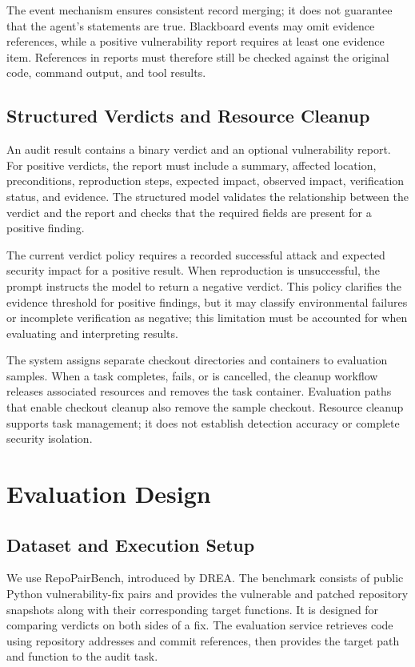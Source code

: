 \documentclass[10pt,a4paper]{article}
\begin{document}
The event mechanism ensures consistent record merging; it does not guarantee that the agent's statements are true. Blackboard events may omit evidence references, while a positive vulnerability report requires at least one evidence item. References in reports must therefore still be checked against the original code, command output, and tool results.

\subsection{Structured Verdicts and Resource Cleanup}

An audit result contains a binary verdict and an optional vulnerability report. For positive verdicts, the report must include a summary, affected location, preconditions, reproduction steps, expected impact, observed impact, verification status, and evidence. The structured model validates the relationship between the verdict and the report and checks that the required fields are present for a positive finding.

The current verdict policy requires a recorded successful attack and expected security impact for a positive result. When reproduction is unsuccessful, the prompt instructs the model to return a negative verdict. This policy clarifies the evidence threshold for positive findings, but it may classify environmental failures or incomplete verification as negative; this limitation must be accounted for when evaluating and interpreting results.

The system assigns separate checkout directories and containers to evaluation samples. When a task completes, fails, or is cancelled, the cleanup workflow releases associated resources and removes the task container. Evaluation paths that enable checkout cleanup also remove the sample checkout. Resource cleanup supports task management; it does not establish detection accuracy or complete security isolation.

\section{Evaluation Design}

\subsection{Dataset and Execution Setup}

We use RepoPairBench, introduced by DREA. The benchmark consists of public Python vulnerability-fix pairs and provides the vulnerable and patched repository snapshots along with their corresponding target functions. It is designed for comparing verdicts on both sides of a fix. The evaluation service retrieves code using repository addresses and commit references, then provides the target path and function to the audit task.
\end{document}
